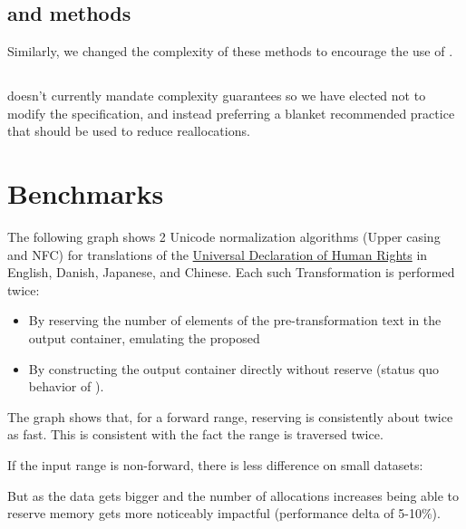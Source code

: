 \documentclass{wg21}
\begin{document}
\subsection{  and  methods}

Similarly, we changed the complexity of these methods to encourage the use of .

\subsection{}

 doesn't currently mandate complexity guarantees so we have elected not to modify the specification,
and instead preferring a blanket recommended practice that  should be used to reduce reallocations.

\section{Benchmarks}

The following graph shows 2 Unicode normalization algorithms (Upper casing and NFC) for translations of the \href{https://unicode.org/udhr/index.html}{Universal Declaration of Human Rights} in English, Danish, Japanese, and Chinese.
Each such Transformation is performed twice:

\begin{itemize}
\item By reserving the number of elements of the pre-transformation text in the output container, emulating the proposed 
\item By constructing the output container directly without reserve (status quo behavior of ).
\end{itemize}

The graph shows that, for a forward range, reserving is consistently about twice as fast. This is consistent with the fact the range is traversed twice.


If the input range is non-forward, there is less difference on small datasets:


But as the data gets bigger and the number of allocations increases being able to reserve memory gets more noticeably impactful (performance delta of 5-10\%).
\end{document}
